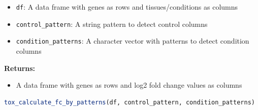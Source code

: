 \documentclass[11pt]{article}
\begin{document}
\begin{enumerate}
	      \begin{itemize}
	      	\item \texttt{df}: A data frame with genes as rows and tissues/conditions
	      	      as columns
	      	      
	      	\item \texttt{control\_pattern}: A string pattern to detect control columns
	      	      
	      	\item \texttt{condition\_patterns}: A character vector with patterns to detect
	      	      condition columns
	      \end{itemize}
	      
	      \textbf{Returns:}
	      \begin{itemize}
	      	\item A data frame with genes as rows and log2 fold change values as columns
	      \end{itemize}
	      
	      \begin{lstlisting}[language=R, caption={R Fold Change Calculation}]
tox_calculate_fc_by_patterns(df, control_pattern, condition_patterns)
	      \end{lstlisting}
\end{enumerate}
\end{document}
